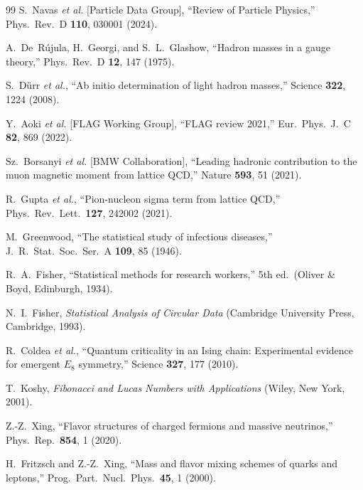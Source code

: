 \documentclass[11pt,a4paper]{article}
\begin{document}
\begin{thebibliography}{99}
  S.~Navas \textit{et al.} [Particle Data Group],
  ``Review of Particle Physics,''
  Phys.\ Rev.\ D \textbf{110}, 030001 (2024).

  A.~De~R\'ujula, H.~Georgi, and S.~L.~Glashow,
  ``Hadron masses in a gauge theory,''
  Phys.\ Rev.\ D \textbf{12}, 147 (1975).

  S.~D\"urr \textit{et al.},
  ``Ab initio determination of light hadron masses,''
  Science \textbf{322}, 1224 (2008).

  Y.~Aoki \textit{et al.} [FLAG Working Group],
  ``FLAG review 2021,''
  Eur.\ Phys.\ J.\ C \textbf{82}, 869 (2022).

  Sz.~Borsanyi \textit{et al.} [BMW Collaboration],
  ``Leading hadronic contribution to the muon magnetic moment
  from lattice QCD,''
  Nature \textbf{593}, 51 (2021).

  R.~Gupta \textit{et al.},
  ``Pion-nucleon sigma term from lattice QCD,''
  Phys.\ Rev.\ Lett.\ \textbf{127}, 242002 (2021).

  M.~Greenwood,
  ``The statistical study of infectious diseases,''
  J.\ R.\ Stat.\ Soc.\ Ser.\ A \textbf{109}, 85 (1946).

  R.~A.~Fisher,
  ``Statistical methods for research workers,''
  5th ed.\ (Oliver \& Boyd, Edinburgh, 1934).

  N.~I.~Fisher,
  \textit{Statistical Analysis of Circular Data}
  (Cambridge University Press, Cambridge, 1993).

  R.~Coldea \textit{et al.},
  ``Quantum criticality in an Ising chain: Experimental evidence
  for emergent $E_8$ symmetry,''
  Science \textbf{327}, 177 (2010).

  T.~Koshy,
  \textit{Fibonacci and Lucas Numbers with Applications}
  (Wiley, New York, 2001).

  Z.-Z.~Xing,
  ``Flavor structures of charged fermions and massive neutrinos,''
  Phys.\ Rep.\ \textbf{854}, 1 (2020).

  H.~Fritzsch and Z.-Z.~Xing,
  ``Mass and flavor mixing schemes of quarks and leptons,''
  Prog.\ Part.\ Nucl.\ Phys.\ \textbf{45}, 1 (2000).


\end{thebibliography}
\end{document}
